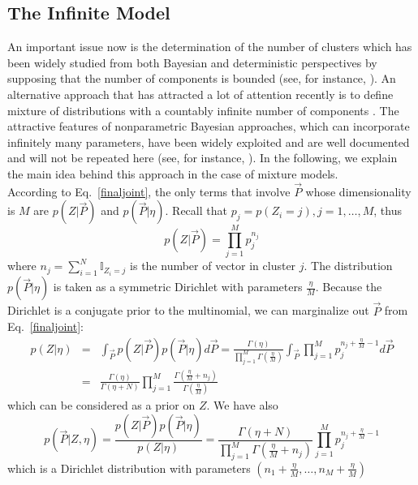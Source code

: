 \documentclass[journal,10pt]{elsart}
\begin{document}
\subsection{The Infinite Model}
An important issue now is the determination of the number of clusters which has been widely studied from both Bayesian and deterministic perspectives by supposing that the number of components is bounded (see, for instance, \cite{McLachlan2000,BouguilaPAMI2007}). An alternative approach that has attracted a lot of attention recently is to define mixture of distributions with a countably infinite number of components \cite{Edward2000}. The attractive features of nonparametric Bayesian approaches, which can incorporate infinitely many parameters, have been widely exploited and are well documented and will not be repeated here (see, for instance, \cite{Neal2000,Edward2000,Ghosh2003,BouguilaIEEETNN2010}). In the following, we explain the main idea behind this approach in the case of mixture models. \\
According to Eq.~\ref{finaljoint}, the only terms that involve $\vec{P}$ whose dimensionality is $M$ are $p(Z|\vec{P})$ and $p(\vec{P}|\eta)$. Recall that $p_j=p(Z_i=j), j=1,\ldots,M$, thus
\begin{equation}\label{postdiric2}
p(Z|\vec{P})=\prod_{j=1}^M p_j^{n_{j}}
\end{equation}
where $n_j=\sum_{i=1}^N \mathbb{I}_{Z_{i}=j}$ is the number of vector in cluster $j$. The distribution $p(\vec{P}|\eta)$ is taken as a symmetric Dirichlet with parameters $\frac{\eta}{M}$. Because the Dirichlet is a conjugate prior to the multinomial, we can marginalize out $\vec{P}$ from Eq.~\ref{finaljoint}:
\begin{eqnarray}\label{likelihoodeta}
\nonumber p(Z|\eta)&=&\int_{\vec{P}}p(Z|\vec{P})p(\vec{P}|\eta)d\vec{P}=\frac{\Gamma(\eta)}{\prod_{j=1}^{M}\Gamma(\frac{\eta}{M})}\int_{\vec{P}}\prod_{j=1}^M p_j^{n_{j}+\frac{\eta}{M}-1}d\vec{P}\\&=&\frac{\Gamma(\eta)}{\Gamma(\eta+N)}\prod_{j=1}^{M}\frac{\Gamma(\frac{\eta}{M}+n_j)}{\Gamma(\frac{\eta}{M})}
\end{eqnarray}
which can be considered as a prior on $Z$. We have also
\begin{equation}
p(\vec{P}|Z,\eta)=\frac{p(Z|\vec{P})p(\vec{P}|\eta)}{p(Z|\eta)}=\frac{\Gamma(\eta+N)}{\prod_{j=1}^{M}\Gamma(\frac{\eta}{M}+n_j)}\prod_{j=1}^{M}p_j^{n_{j}+\frac{\eta}{M}-1}
\end{equation}
which is a Dirichlet distribution with parameters $(n_{1}+\frac{\eta}{M},\ldots,n_{M}+\frac{\eta}{M})$
\end{document}
